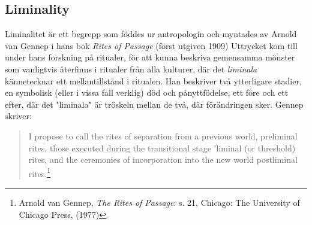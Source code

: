 \documentclass{article}
\begin{document}
\subsection{Liminality}
Liminalitet är ett begrepp som föddes ur antropologin och myntades av Arnold van Gennep i hans bok \emph{Rites
of Passage} (först utgiven 1909) Uttrycket kom till under hans forskning på ritualer, för att kunna beskriva
gemensamma mönster som vanligtvis återfinns i ritualer från alla kulturer, där det \emph{liminala}
kännetecknar ett mellantillstånd i ritualen. Han beskriver två ytterligare stadier, en symbolisk (eller i
vissa fall verklig) död och pånyttfödelse, ett före och ett efter, där det "liminala" är
tröskeln mellan de två, där förändringen sker.
Gennep skriver:

\begin{quote}
I propose to call the rites of separation from a previous world, preliminal rites, those executed during the
transitional stage 'liminal (or threshold) rites, and the ceremonies of incorporation into the new world
postliminal rites.\footnote{Arnold van Gennep, \emph{The Rites of Passage}: s. 21,  Chicago: The
University of Chicago Press, (1977)}
\end{quote}

\end{document}
